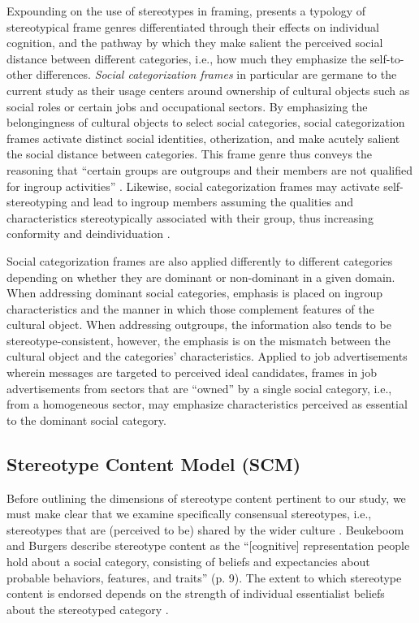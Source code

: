 \documentclass[jou]{apa7}
\begin{document}
Expounding on the use of stereotypes in framing, \textcite{Yang2015a} presents a typology of stereotypical frame genres differentiated through their effects on individual cognition, and the pathway by which they make salient the perceived social distance between different categories, i.e., how much they emphasize the self-to-other differences. \emph{Social categorization frames} in particular are germane to the current study as their usage centers around ownership of cultural objects such as social roles or certain jobs and occupational sectors. By emphasizing the belongingness of cultural objects to select social categories, social categorization frames activate distinct social identities, otherization, and make acutely salient the social distance between categories. This frame genre thus conveys the reasoning that “certain groups are outgroups and their members are not qualified for ingroup activities” \parencite[][p. 261]{Yang2015a}. Likewise, social categorization frames may activate self-stereotyping and lead to ingroup members assuming the qualities and characteristics stereotypically associated with their group, thus increasing conformity and deindividuation \parencite{brownBlackwellHandbookSocial2003}.

Social categorization frames are also applied differently to different categories depending on whether they are dominant or non-dominant in a given domain. When addressing dominant social categories, emphasis is placed on ingroup characteristics and the manner in which those complement features of the cultural object. When addressing outgroups, the information also tends to be stereotype-consistent, however, the emphasis is on the mismatch between the cultural object and the categories’ characteristics. Applied to job advertisements wherein messages are targeted to perceived ideal candidates, frames in job advertisements from sectors that are “owned” by a single social category, i.e., from a homogeneous sector, may emphasize characteristics perceived as essential to the dominant social category.

\subsection{Stereotype Content Model (SCM)}
\label{stereotype_content_model}
Before outlining the dimensions of stereotype content pertinent to our study, we must make clear that we examine specifically consensual stereotypes, i.e., stereotypes that are (perceived to be) shared by the wider culture \parencite{Zanna2013}. Beukeboom and Burgers \parencite{Beukeboom2019} describe stereotype content as the “[cognitive] representation people hold about a social category, consisting of beliefs and expectancies about probable behaviors, features, and traits” (p. 9). The extent to which stereotype content is endorsed depends on the strength of individual essentialist beliefs about the stereotyped category \parencite[for perceived category essentialism and stereotyping, see][]{Beukeboom2019,bastianPsychologicalEssentialismStereotype2006}.
\end{document}
